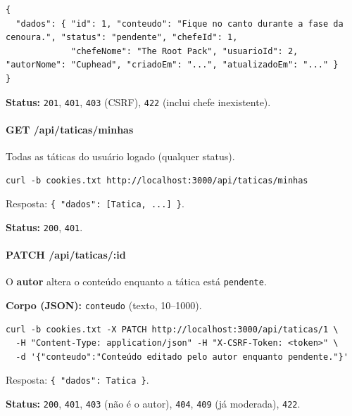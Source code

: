 \begin{Verbatim}[breaklines,breakanywhere,fontsize=\scriptsize]
{
  "dados": { "id": 1, "conteudo": "Fique no canto durante a fase da cenoura.", "status": "pendente", "chefeId": 1,
             "chefeNome": "The Root Pack", "usuarioId": 2, "autorNome": "Cuphead", "criadoEm": "...", "atualizadoEm": "..." }
}
\end{Verbatim}

\textbf{Status:} \texttt{201}, \texttt{401}, \texttt{403} (CSRF),
\texttt{422} (inclui chefe inexistente).

\hypertarget{get-apitaticasminhas}{%
\paragraph{GET /api/taticas/minhas}\label{get-apitaticasminhas}}

Todas as táticas do usuário logado (qualquer status).

\begin{Verbatim}[breaklines,breakanywhere,fontsize=\scriptsize]
curl -b cookies.txt http://localhost:3000/api/taticas/minhas
\end{Verbatim}

Resposta: \texttt{\{\ "dados":\ {[}Tatica,\ ...{]}\ \}}.

\textbf{Status:} \texttt{200}, \texttt{401}.

\hypertarget{patch-apitaticasid}{%
\paragraph{PATCH /api/taticas/:id}\label{patch-apitaticasid}}

O \textbf{autor} altera o conteúdo enquanto a tática está
\texttt{pendente}.

\textbf{Corpo (JSON):} \texttt{conteudo} (texto, 10--1000).

\begin{Verbatim}[breaklines,breakanywhere,fontsize=\scriptsize]
curl -b cookies.txt -X PATCH http://localhost:3000/api/taticas/1 \
  -H "Content-Type: application/json" -H "X-CSRF-Token: <token>" \
  -d '{"conteudo":"Conteúdo editado pelo autor enquanto pendente."}'
\end{Verbatim}

Resposta: \texttt{\{\ "dados":\ Tatica\ \}}.

\textbf{Status:} \texttt{200}, \texttt{401}, \texttt{403} (não é o
autor), \texttt{404}, \texttt{409} (já moderada), \texttt{422}.

